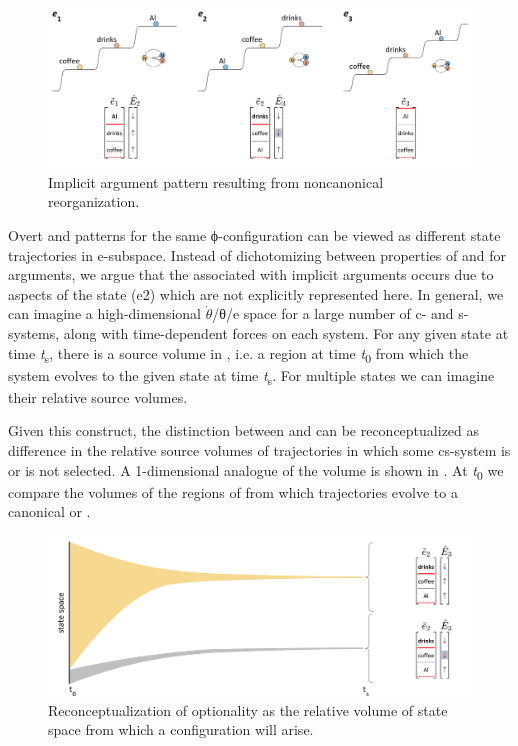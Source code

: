   
\begin{figure}
\includegraphics[width=\textwidth]{figures/Tilsen-img87.png}
\caption{Implicit argument pattern resulting from noncanonical reorganization.}
\label{fig:4:37}
\end{figure}
 

  Overt and  patterns for the same ϕ-configuration can be viewed as different state trajectories in e-subspace. Instead of dichotomizing between properties of  and  for arguments, we argue that the  associated with implicit arguments occurs due to aspects of the state (e2) which are not explicitly represented here. In general, we can imagine a high-dimensional $\dot{\theta}$/θ/e space for a large number of c- and s-systems, along with time-dependent  forces on each system. For any given state at time \textit{t}\textsubscript{s}, there is a source volume in , i.e. a  region at time \textit{t}\textsubscript{0} from which the system evolves to the given state at time \textit{t}\textsubscript{s}. For multiple states we can imagine their relative source volumes. 

  Given this construct, the distinction between  and  can be reconceptualized as difference in the relative source volumes of trajectories in which some cs-system is or is not selected. A 1-dimensional analogue of the  volume is shown in {}. At \textit{t}\textsubscript{0} we compare the volumes of the regions of  from which trajectories evolve to a canonical or .

  
\begin{figure}
\includegraphics[width=\textwidth]{figures/Tilsen-img88.png}
\caption{Reconceptualization of optionality as the relative volume of state space from which a configuration will arise.}
\label{fig:4:38}
\end{figure}
 

